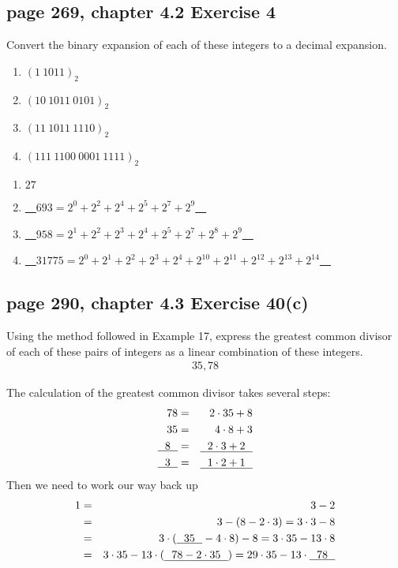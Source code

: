 \documentclass[sigconf]{acmart}
\begin{document}
\subsection{page 269, chapter 4.2 Exercise 4}
\begin{shaded}
    Convert the binary expansion of each of these integers to a decimal expansion.
    \begin{enumerate}[label=(\alph*)]
    	\item $(1~1011)_2$
    	\item $(10~1011~0101)_2$
    	\item $(11~1011~1110)_2$
    	\item $(111~1100~0001~1111)_2$
    \end{enumerate}
\end{shaded}  
\begin{enumerate}[label=(\alph*)]
	\item $27$
	\item \uline{~~$693 = 2^0 + 2^2 + 2^4 + 2^5 + 2^7 + 2^9$~~}
	\item \uline{~~$958 = 2^1 + 2^2 + 2^3 + 2^4 + 2^5 + 2^7 + 2^8 + 2^9$~~}
	\item \uline{~~$31775 = 2^0 + 2^1 + 2^2 + 2^3 + 2^4 + 2^{10} + 2^{11} + 2^{12} + 2^{13} +  2^{14}$~~}
\end{enumerate}

\subsection{page 290, chapter 4.3 Exercise 40(c)}
\begin{shaded}
    Using the method followed in Example 17, express the greatest common divisor of each of these pairs of integers as a linear combination of these integers.   
    \begin{eqnarray*}
        35, 78
    \end{eqnarray*}
\end{shaded}  
The calculation of the greatest common divisor takes several steps:
\begin{eqnarray*}
    78 & = & 2 \cdot 35 + 8 \\
    35 & = & 4 \cdot 8 + 3 \\
    \uline{~~8~~} & = & \uline{~~2 \cdot 3 + 2~~}  \\
    \uline{~~3~~} & = & \uline{~~1 \cdot 2 + 1~~}
\end{eqnarray*}
Then we need to work our way back up
\begin{eqnarray*}
    1 & = & 3 - 2                  \\
    ~ & = & 3 - (8 - 2 \cdot 3)        =  3 \cdot 3 - 8 \\
    ~ & = & 3 \cdot (\uline{~~35~~} - 4 \cdot 8) -8 =  3 \cdot 35 - 13 \cdot 8 \\
    ~ & = & 3 \cdot 35 - 13 \cdot (\uline{~~78 - 2 \cdot 35 ~~})  =  29 \cdot 35 - 13 \cdot \uline{~~78~~}
\end{eqnarray*}
\end{document}
